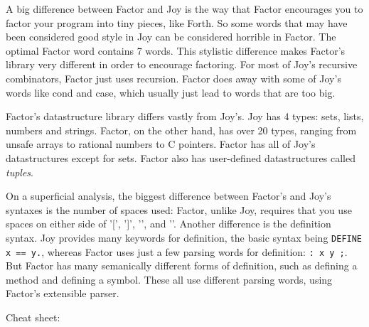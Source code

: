 \documentclass{article}
\begin{document}
A big difference between Factor and Joy is the way that Factor encourages you to factor your program into tiny pieces, like Forth. So some words that may have been considered good style in Joy can be considered horrible in Factor. The optimal Factor word contains 7 words. This stylistic difference makes Factor's library very different in order to encourage factoring. For most of Joy's recursive combinators, Factor just uses recursion. Factor does away with some of Joy's words like cond and case, which usually just lead to words that are too big.

Factor's datastructure library differs vastly from Joy's. Joy has 4 types: sets, lists, numbers and strings. Factor, on the other hand, has over 20 types, ranging from unsafe arrays to rational numbers to C pointers. Factor has all of Joy's datastructures except for sets. Factor also has user-defined datastructures called \emph{tuples}.

On a superficial analysis, the biggest difference between Factor's and Joy's syntaxes is the number of spaces used: Factor, unlike Joy, requires that you use spaces on either side of '[', ']', '{', and '}'. Another difference is the definition syntax. Joy provides many keywords for definition, the basic syntax being \verb|DEFINE x == y.|, whereas Factor uses just a few parsing words for definition: \verb|: x y ;|. But Factor has many semanically different forms of definition, such as defining a method and defining a symbol. These all use different parsing words, using Factor's extensible parser.

Cheat sheet:
\end{document}
